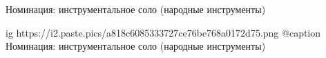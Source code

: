  
 
 
 
 

Номинация: инструментальное соло (народные инструменты)

\ifcmt
  ig https://i2.paste.pics/a818c6085333727ce76be768a0172d75.png
  @caption Номинация: инструментальное соло (народные инструменты)
\fi
